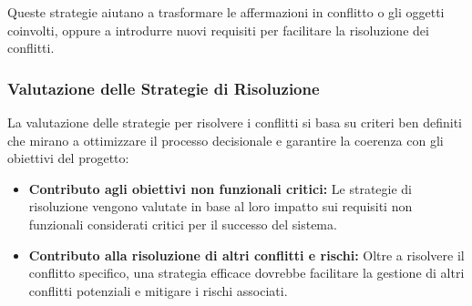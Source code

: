 Queste strategie aiutano a trasformare le affermazioni in conflitto o gli oggetti coinvolti,
oppure a introdurre nuovi requisiti per facilitare la risoluzione dei conflitti.

\subsubsection{Valutazione delle Strategie di Risoluzione}
\begin{figure}[H]
    \centering
\end{figure}
La valutazione delle strategie per risolvere i conflitti si basa su criteri ben definiti
che mirano a ottimizzare il processo decisionale e garantire la coerenza con gli obiettivi
del progetto:

\begin{itemize}
    \item \textbf{Contributo agli obiettivi non funzionali critici:} Le strategie di
    risoluzione vengono valutate in base al loro impatto sui requisiti non funzionali
    considerati critici per il successo del sistema.
    \item \textbf{Contributo alla risoluzione di altri conflitti e rischi:} Oltre a
    risolvere il conflitto specifico, una strategia efficace dovrebbe facilitare la
    gestione di altri conflitti potenziali e mitigare i rischi associati.
\end{itemize}

